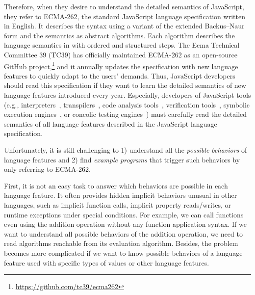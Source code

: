Therefore, when they desire to understand the detailed semantics of JavaScript,
they refer to ECMA-262, the standard JavaScript language specification written
in English.  It describes the syntax using a variant of the extended Backus–Naur
form and the semantics as abstract algorithms.  Each algorithm describes the
language semantics in with ordered and structured steps.  The Ecma Technical
Committee 39 (TC39) has officially maintained ECMA-262 as an open-source GitHub
project,\footnote{\url{https://github.com/tc39/ecma262}} and it annually updates
the specification with new language features to quickly adapt to the users'
demands.  Thus, JavaScript developers should read this specification if they
want to learn the detailed semantics of new language features introduced every
year.  Especially, developers of JavaScript tools (e.g.,
interpreters~\cite{v8, jscore, spidermonkey, graaljs},
transpilers~\cite{babel},
code analysis tools~\cite{safe, safe2, tajs, wala, jsai},
verification tools~\cite{javert, javert2, ad-safety, javanni},
symbolic execution engines~\cite{symbolic-js, sym-js, expo-se},
or concolic testing engines~\cite{jalangi, type-conc-test})
must carefully read the detailed semantics of all language features described in
the JavaScript language specification.

Unfortunately, it is still challenging to 1) understand all the \textit{possible
behaviors} of language features and 2) find \textit{example programs} that
trigger such behaviors by only referring to ECMA-262.

First, it is not an easy task to answer which behaviors are possible in each
language feature.  It often provides hidden implicit behaviors unusual in other
languages, such as implicit function calls, implicit property reads/writes, or
runtime exceptions under special conditions.  For example, we can call functions
even using the addition operation without any function application syntax.  If
we want to understand all possible behaviors of the addition operation, we need
to read  algorithms reachable from its evaluation algorithm.
Besides, the problem becomes more complicated if we want to know possible
behaviors of a language feature used with specific types of values or other
language features.

